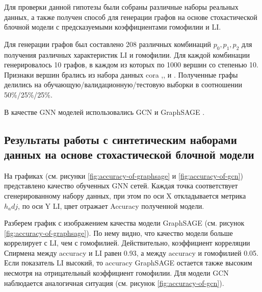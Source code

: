 \documentclass[a4paper,14pt]{article}
\begin{document}
	Для проверки данной гипотезы были собраны различные наборы реальных данных, а также получен способ для генерации графов на основе стохастической блочной модели с предсказуемыми коэффициентами гомофилии и LI.
	
	Для генерации графов был составлено 208 различных комбинаций $p_0,p_1,p_2$ для получения различных характеристик LI и гомофилии.
	Для каждой комбинации генерировалось 10 графов, в каждом из которых по 1000 вершин со степенью 10.
	Признаки вершин брались из набора данных cora \cite{mccallum2000automating},\cite{namata2012query},\cite{sen2008collective} и \cite{yang2016revisiting}.
	Полученные графы делились на обучающую/валидационную/тестовую выборки в соотношении 50\%/25\%/25\%.
	
	В качестве GNN моделей использовались GCN \cite{kipf2016semi} и GraphSAGE \cite{hamilton2017inductive}.
	
	\subsection{Результаты работы с синтетическим наборами данных на основе стохастической блочной модели}

	На графиках (см. рисунки \ref{fig:accuracy-of-graphsage} и \ref{fig:accuracy-of-gcn}) представлено качество обученных GNN сетей.
	Каждая точка соответствует сгенерированному набору данных, при этом по оси X откладывается метрика $h_adj$, по оси Y LI, цвет отражает Accuracy полученной модели. 
	
	Разберем график с изображением качества модели GraphSAGE (см. рисунок \ref{fig:accuracy-of-graphsage}).
	По нему видно, что качество модели больше коррелирует с LI, чем с гомофилией.
	Действительно, коэффициент корреляции Спирмена между accuracy и LI равен 0.93, а между accuracy и гомофилией 0.05.
	Если показатель LI высокий, то accuracy GraphSAGE остается также высоким несмотря на отрицательный коэффициент гомофилии.
	Для модели GCN наблюдается аналогичная ситуация (см. рисунок \ref{fig:accuracy-of-gcn}).
\end{document}
